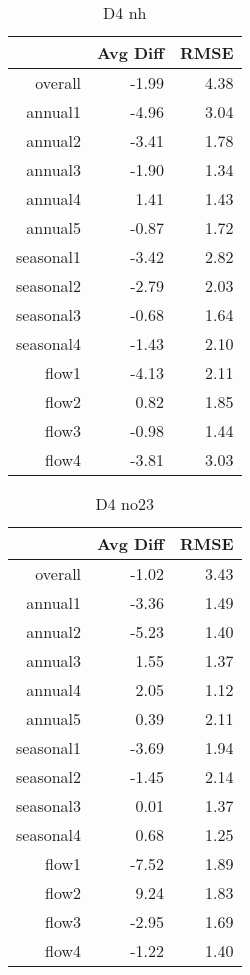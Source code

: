 \begin{table}[H]
\centering
\begin{tabular}{rrr}
  \hline
 & Avg Diff & RMSE \\ 
  \hline
overall & -1.99 & 4.38 \\ 
  annual1 & -4.96 & 3.04 \\ 
  annual2 & -3.41 & 1.78 \\ 
  annual3 & -1.90 & 1.34 \\ 
  annual4 & 1.41 & 1.43 \\ 
  annual5 & -0.87 & 1.72 \\ 
  seasonal1 & -3.42 & 2.82 \\ 
  seasonal2 & -2.79 & 2.03 \\ 
  seasonal3 & -0.68 & 1.64 \\ 
  seasonal4 & -1.43 & 2.10 \\ 
  flow1 & -4.13 & 2.11 \\ 
  flow2 & 0.82 & 1.85 \\ 
  flow3 & -0.98 & 1.44 \\ 
  flow4 & -3.81 & 3.03 \\ 
   \hline
\end{tabular}
\caption{D4 nh} 
\end{table}
\begin{table}[H]
\centering
\begin{tabular}{rrr}
  \hline
 & Avg Diff & RMSE \\ 
  \hline
overall & -1.02 & 3.43 \\ 
  annual1 & -3.36 & 1.49 \\ 
  annual2 & -5.23 & 1.40 \\ 
  annual3 & 1.55 & 1.37 \\ 
  annual4 & 2.05 & 1.12 \\ 
  annual5 & 0.39 & 2.11 \\ 
  seasonal1 & -3.69 & 1.94 \\ 
  seasonal2 & -1.45 & 2.14 \\ 
  seasonal3 & 0.01 & 1.37 \\ 
  seasonal4 & 0.68 & 1.25 \\ 
  flow1 & -7.52 & 1.89 \\ 
  flow2 & 9.24 & 1.83 \\ 
  flow3 & -2.95 & 1.69 \\ 
  flow4 & -1.22 & 1.40 \\ 
   \hline
\end{tabular}
\caption{D4 no23} 
\end{table}
